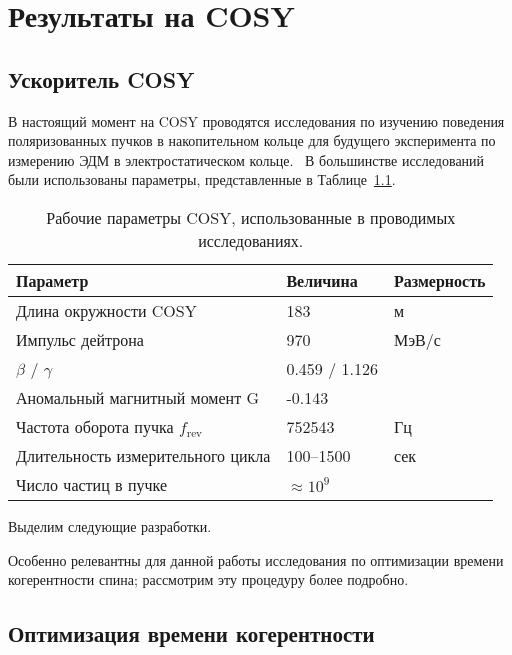 \chapter{Результаты на COSY}\label{chpt4:top-level}

\section{Ускоритель COSY}


В настоящий момент на COSY проводятся исследования по изучению поведения поляризованных пучков в накопительном кольце для будущего эксперимента по измерению ЭДМ в электростатическом кольце.~\cite{Lehrach:Precursor2012, Lehrach:IPAC15, COSY:SpinTuneMapping, Eversmann:SpinTuneMeasurement, COSY:SCT:1000sec, Wagner:BBA2018}
В большинстве исследований были использованы параметры, представленные в Таблице~\ref{tbl:COSY-studies}.

\begin{table}[h]\centering
	\caption{Рабочие параметры COSY, использованные в проводимых исследованиях.\label{tbl:COSY-studies}}
	\begin{tabular}{lll}
		\toprule
		Параметр & Величина & Размерность \\
		\midrule
		Длина окружности COSY& 183 & м\\
		Импульс дейтрона & 970 & МэВ/с \\
		 $\beta$ / $\gamma$ & 0.459 / 1.126 & \\
		 Аномальный магнитный момент G& -0.143& \\
		 Частота оборота пучка $f_{\mathrm{rev}}$& 752543& Гц\\
		 Длительность измерительного цикла& 100--1500& сек\\
		 Число частиц в пучке & $\approx 10^9$& \\
		 \bottomrule
	\end{tabular}
\end{table}

Выделим следующие разработки.


Особенно релевантны для данной работы исследования по оптимизации времени когерентности спина; рассмотрим эту процедуру более подробно.
\section{Оптимизация времени когерентности}\label{sec:COSY:SCT-optimization}



\clearpage
